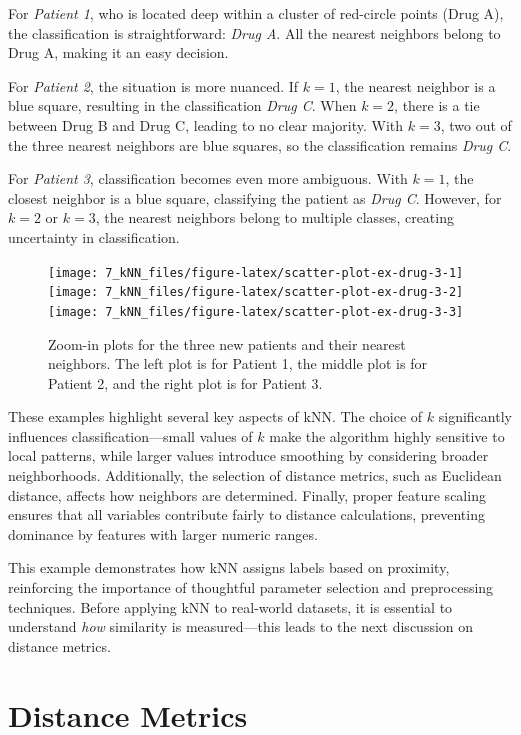 \documentclass[
  11pt,
]{book}
\theoremstyle{definition}
\theoremstyle{definition}
\theoremstyle{definition}
\theoremstyle{definition}
\theoremstyle{remark}
\begin{document}
For \emph{Patient 1}, who is located deep within a cluster of red-circle points (Drug A), the classification is straightforward: \emph{Drug A}. All the nearest neighbors belong to Drug A, making it an easy decision.

For \emph{Patient 2}, the situation is more nuanced. If \(k = 1\), the nearest neighbor is a blue square, resulting in the classification \emph{Drug C}. When \(k = 2\), there is a tie between Drug B and Drug C, leading to no clear majority. With \(k = 3\), two out of the three nearest neighbors are blue squares, so the classification remains \emph{Drug C}.

For \emph{Patient 3}, classification becomes even more ambiguous. With \(k = 1\), the closest neighbor is a blue square, classifying the patient as \emph{Drug C}. However, for \(k = 2\) or \(k = 3\), the nearest neighbors belong to multiple classes, creating uncertainty in classification.

\begin{figure}[H]
\texttt{[image: 7\_kNN\_files/figure-latex/scatter-plot-ex-drug-3-1]} \texttt{[image: 7\_kNN\_files/figure-latex/scatter-plot-ex-drug-3-2]} \texttt{[image: 7\_kNN\_files/figure-latex/scatter-plot-ex-drug-3-3]} \caption{Zoom-in plots for the three new patients and their nearest neighbors. The left plot is for Patient 1, the middle plot is for Patient 2, and the right plot is for Patient 3.}\label{fig:scatter-plot-ex-drug-3}
\end{figure}

These examples highlight several key aspects of kNN. The choice of \(k\) significantly influences classification---small values of \(k\) make the algorithm highly sensitive to local patterns, while larger values introduce smoothing by considering broader neighborhoods. Additionally, the selection of distance metrics, such as Euclidean distance, affects how neighbors are determined. Finally, proper feature scaling ensures that all variables contribute fairly to distance calculations, preventing dominance by features with larger numeric ranges.

This example demonstrates how kNN assigns labels based on proximity, reinforcing the importance of thoughtful parameter selection and preprocessing techniques. Before applying kNN to real-world datasets, it is essential to understand \emph{how} similarity is measured---this leads to the next discussion on distance metrics.

\section{Distance Metrics}\label{distance-metrics}
\end{document}
